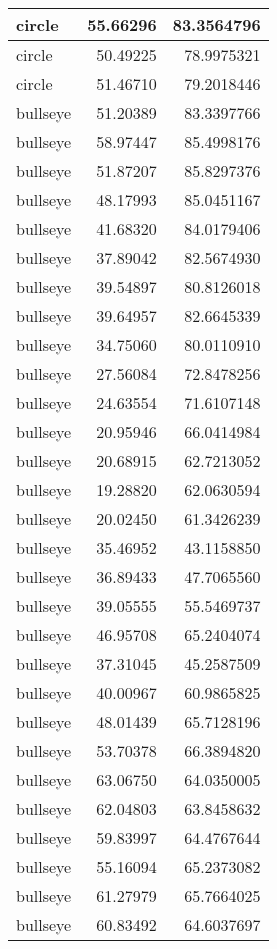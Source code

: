 \documentclass[
]{book}
\theoremstyle{definition}
\theoremstyle{definition}
\theoremstyle{definition}
\theoremstyle{definition}
\theoremstyle{remark}
\begin{document}
\begin{tabular}{l|r|r}
\hline
circle & 55.66296 & 83.3564796\\
\hline
circle & 50.49225 & 78.9975321\\
\hline
circle & 51.46710 & 79.2018446\\
\hline
bullseye & 51.20389 & 83.3397766\\
\hline
bullseye & 58.97447 & 85.4998176\\
\hline
bullseye & 51.87207 & 85.8297376\\
\hline
bullseye & 48.17993 & 85.0451167\\
\hline
bullseye & 41.68320 & 84.0179406\\
\hline
bullseye & 37.89042 & 82.5674930\\
\hline
bullseye & 39.54897 & 80.8126018\\
\hline
bullseye & 39.64957 & 82.6645339\\
\hline
bullseye & 34.75060 & 80.0110910\\
\hline
bullseye & 27.56084 & 72.8478256\\
\hline
bullseye & 24.63554 & 71.6107148\\
\hline
bullseye & 20.95946 & 66.0414984\\
\hline
bullseye & 20.68915 & 62.7213052\\
\hline
bullseye & 19.28820 & 62.0630594\\
\hline
bullseye & 20.02450 & 61.3426239\\
\hline
bullseye & 35.46952 & 43.1158850\\
\hline
bullseye & 36.89433 & 47.7065560\\
\hline
bullseye & 39.05555 & 55.5469737\\
\hline
bullseye & 46.95708 & 65.2404074\\
\hline
bullseye & 37.31045 & 45.2587509\\
\hline
bullseye & 40.00967 & 60.9865825\\
\hline
bullseye & 48.01439 & 65.7128196\\
\hline
bullseye & 53.70378 & 66.3894820\\
\hline
bullseye & 63.06750 & 64.0350005\\
\hline
bullseye & 62.04803 & 63.8458632\\
\hline
bullseye & 59.83997 & 64.4767644\\
\hline
bullseye & 55.16094 & 65.2373082\\
\hline
bullseye & 61.27979 & 65.7664025\\
\hline
bullseye & 60.83492 & 64.6037697\\

\end{tabular}
\end{document}

